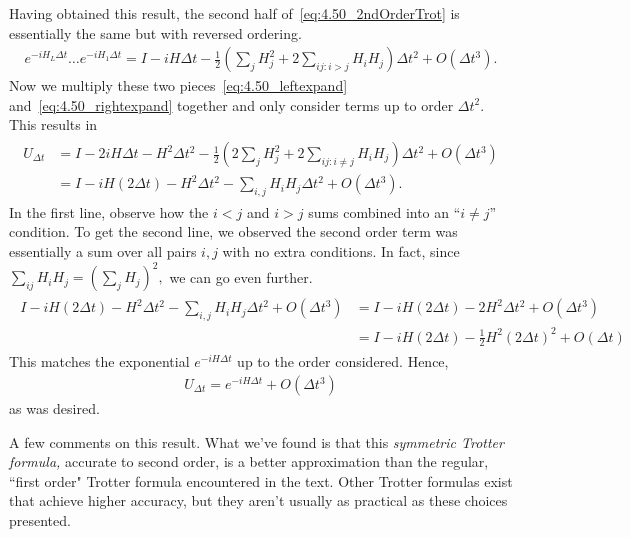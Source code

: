 \documentclass{book}
\begin{document}
    Having obtained this result, the second half of~\eqref{eq:4.50_2ndOrderTrot} is essentially the same but with reversed ordering. 
    \begin{align} \label{eq:4.50_rightexpand}
        e^{-i H_L \Delta t}\dots e^{-i H_1 \Delta t} = I - i H \Delta t - \frac{1}{2}\left(\sum_j H_j^2 + 2 \sum_{ij: i > j} H_i H_j\right)\Delta t^2 + O(\Delta t^3).
    \end{align}
    Now we multiply these two pieces~\eqref{eq:4.50_leftexpand} and~\eqref{eq:4.50_rightexpand} together and only consider terms up to order $\Delta t^2$. This results in
    \begin{align}
    \begin{aligned}
        U_{\Delta t} &= I - 2 i H \Delta t - H^2 \Delta t^2 - \frac{1}{2}\left(2\sum_j  H_j^2 + 2 \sum_{ij: i \neq j} H_i H_j\right)\Delta t^2 + O(\Delta t^3) \\
        &=I - i H (2\Delta t) - H^2 \Delta t^2 - \sum_{i,j} H_i H_j \Delta t^2 + O(\Delta t^3).
    \end{aligned}
    \end{align}
    In the first line, observe how the $i<j$ and $i>j$ sums combined into an ``$i\neq j$'' condition. To get the second line, we observed the second order term was essentially a sum over all pairs $i,j$ with no extra conditions. In fact, since $\sum_{ij} H_i H_j = \left(\sum_j H_j\right)^2,$ we can go even further.
    \begin{align}
    \begin{aligned}
        I - i H (2\Delta t) - H^2 \Delta t^2 - \sum_{i,j} H_i H_j \Delta t^2 + O(\Delta t^3) &= I - i H (2\Delta t) - 2 H^2 \Delta t^2 + O(\Delta t^3) \\
        &= I - i H (2 \Delta t) - \frac{1}{2} H^2 (2\Delta t)^2 + O(\Delta t) 
    \end{aligned}
    \end{align}
    This matches the exponential $e^{-i H \Delta t}$ up to the order considered. Hence,
    \begin{align}
        U_{\Delta t} = e^{-i H \Delta t} + O(\Delta t^3) 
    \end{align}
    as was desired.

    A few comments on this result. What we've found is that this \emph{symmetric Trotter formula,} accurate to second order, is a better approximation than the regular, ``first order" Trotter formula encountered in the text. Other Trotter formulas exist that achieve higher accuracy, but they aren't usually as practical as these choices presented.
\end{document}

